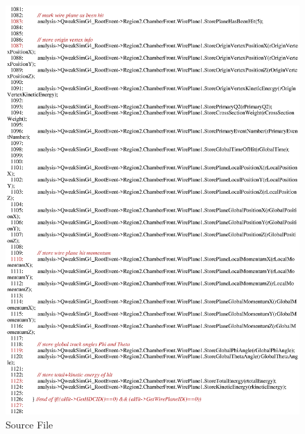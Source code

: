 \clearpage

\begin{figure}[h]
  \hspace{0cm}
  \includegraphics[scale=0.8]{./figures13/QweakSimEventAction.cc-p19.eps}
  \caption{Source File}
           \label{fig:XIII-SC-34}
\end{figure}

\clearpage

